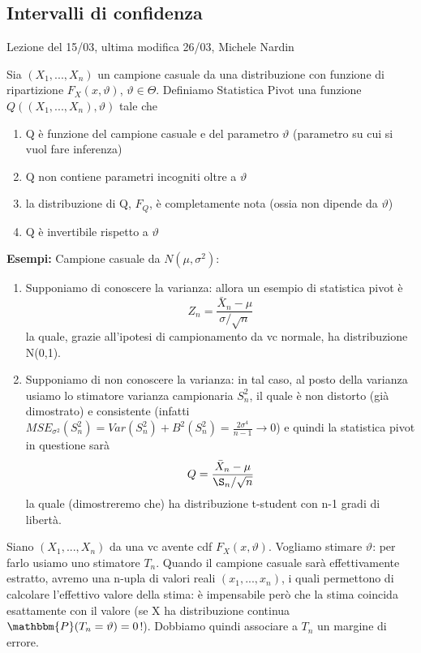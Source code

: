 
\subsection{Intervalli di confidenza}
Lezione del 15/03, ultima modifica 26/03, Michele Nardin

\begin{definizione}
Sia $(X_1,...,X_n)$ un campione casuale da una distribuzione con funzione di ripartizione $F_X (x,\vartheta)$, $\vartheta \in \Theta$. 
Definiamo Statistica Pivot una funzione $Q((X_1,...,X_n),\vartheta)$ tale che
\begin{enumerate}
\item Q è funzione del campione casuale e del parametro $\vartheta$ (parametro su cui si vuol fare inferenza)
\item Q non contiene parametri incogniti oltre a $\vartheta$
\item la distribuzione di Q, $F_Q$, è completamente nota (ossia non dipende da $\vartheta$)
\item Q è invertibile rispetto a $\vartheta$
\end{enumerate}
\end{definizione}

\textbf{Esempi:}
Campione casuale da $N(\mu,\sigma^2)$:
\begin{enumerate}
\item Supponiamo di conoscere la varianza: allora un esempio di statistica pivot è $$Z_n=\frac{\bar{X}_n - \mu}{\sigma / \sqrt{n}} $$ la quale, grazie all'ipotesi di campionamento da vc normale, ha distribuzione N(0,1).
\item Supponiamo di non conoscere la varianza: in tal caso, al posto della varianza usiamo lo stimatore varianza campionaria $S_n^2$, il quale è non distorto (già dimostrato) e consistente (infatti $MSE_{\sigma^2}(S_n^2)=Var(S_n^2) + B^2(S_n^2)=\frac{2\sigma^4}{n-1} \rightarrow 0$) e quindi la statistica pivot in questione sarà $$Q=\frac{\bar{X}_n - \mu}{\S_n / \sqrt{n}}$$ la quale (dimostreremo che) ha distribuzione t-student con n-1 gradi di libertà.
\end{enumerate}

Siano $(X_1,...,X_n)$ da una vc avente cdf $F_X(x,\vartheta)$. Vogliamo stimare $\vartheta$: per farlo usiamo uno stimatore $T_n$.
Quando il campione casuale sarà effettivamente estratto, avremo una n-upla di valori reali $(x_1,...,x_n)$, i quali permettono di calcolare l'effettivo valore della stima: è impensabile però che la stima coincida esattamente con il valore (se X ha distribuzione continua $\mathbbm{P}(T_n=\vartheta)=0$!). Dobbiamo quindi associare a $T_n$ un margine di errore.

